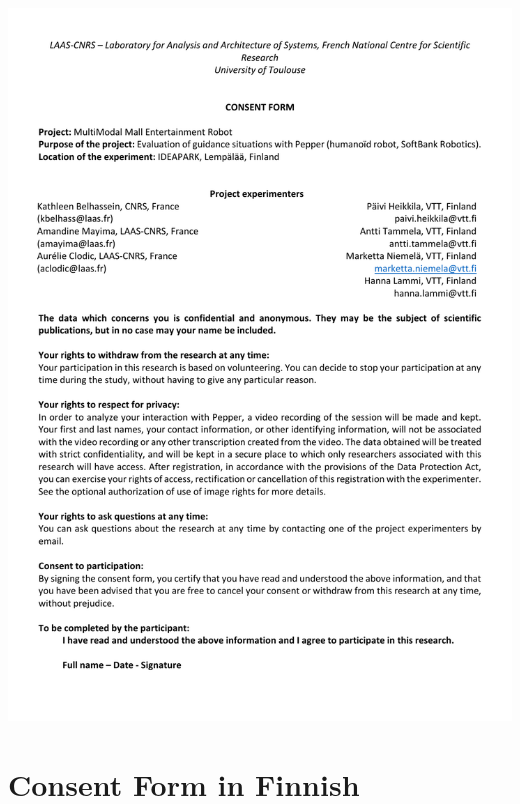 \begin{center}
	\includegraphics[page=2, width=\textwidth]{figures/annexe1/consentform(anglais).pdf} 
\end{center}

\section{Consent Form in Finnish}\label{app:consent_form_fi}

